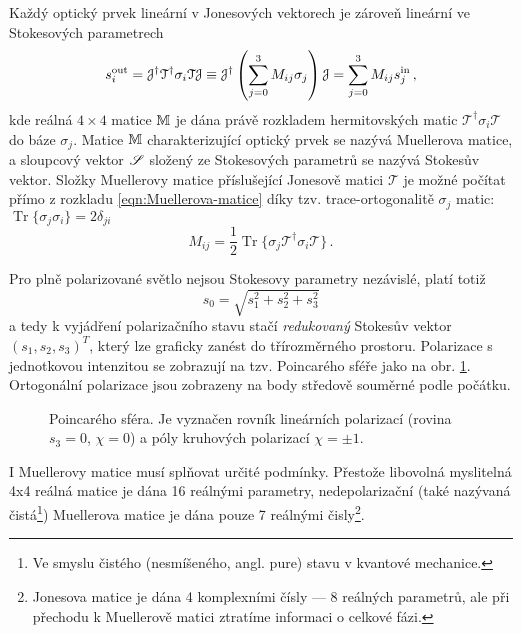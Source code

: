 Každý optický prvek lineární v Jonesových vektorech je zároveň lineární ve Stokesových parametrech
\begin{equation} 
\label{eqn:Muellerova-matice}
    s^\textrm{out}_i=\mathcal{J}^\dagger \mathcal{T}^\dagger \sigma_i \mathcal{T} \mathcal{J}\equiv\mathcal{J}^\dagger \left(\sum_{j=0}^{3} M_{ij} \sigma_j \right) \mathcal{J}
    =\sum_{j=0}^{3} M_{ij} s^\textrm{in}_j \,,
\end{equation}
kde reálná $4\times 4$ matice $\mathbb{M}$ je dána právě rozkladem hermitovských matic $\mathcal{T}^\dagger \sigma_i \mathcal{T}$ do báze $\sigma_j$.
Matice $\mathbb{M}$ charakterizující optický prvek se nazývá Muellerova matice, a sloupcový vektor $\mathscr{S}$ složený ze Stokesových parametrů se nazývá Stokesův vektor.
Složky Muellerovy matice příslušející Jonesově matici $\mathcal{T}$ je možné počítat přímo z rozkladu \eqref{eqn:Muellerova-matice} díky tzv. trace-ortogonalitě $\sigma_j$ matic: $\operatorname{Tr}\lbrace\sigma_j\sigma_i\rbrace=2\delta_{ji}$
\begin{equation} 
\label{eqn:Mueller-rozklad}
    M_{ij}=\frac{1}{2}\operatorname{Tr}\lbrace \sigma_j \mathcal{T}^\dagger \sigma_i \mathcal{T} \rbrace \,.
\end{equation}

Pro plně polarizované světlo nejsou Stokesovy parametry nezávislé, platí totiž
\begin{equation} 
\label{e:norma S}
    s_0=\sqrt{s_1^2+s_2^2+s_3^2}
\end{equation}
a tedy k vyjádření polarizačního stavu stačí \emph{redukovaný} Stokesův vektor $(s_1, s_2, s_3)^T$, který lze graficky zanést do třírozměrného prostoru.
Polarizace s jednotkovou intenzitou se zobrazují na tzv. Poincarého sféře jako na obr. \ref{fig:Poincareho-sfera}.
Ortogonální polarizace jsou zobrazeny na body středově souměrné podle počátku.

\begin{figure}[htbp]
    \centering
    
    \caption{Poincarého sféra. Je vyznačen rovník lineárních polarizací (rovina $s_3=0$, $\chi=0$) a póly kruhových polarizací $\chi=\pm 1$.}
    \label{fig:Poincareho-sfera}
\end{figure}

I Muellerovy matice musí splňovat určité podmínky.
Přestože libovolná myslitelná 4x4 reálná matice je dána 16 reálnými parametry, nedepolarizační (také nazývaná čistá\footnote{Ve smyslu čistého (nesmíšeného, angl. pure) stavu v kvantové mechanice.}) Muellerova matice je dána pouze 7 reálnými čisly\footnote{Jonesova matice je dána 4 komplexními čísly --- 8 reálných parametrů, ale při přechodu k Muellerově matici ztratíme informaci o celkové fázi.}. \cite{ossikovskiDifferentialMatrixFormalism2011}

